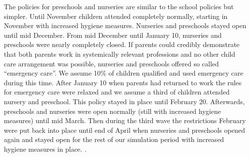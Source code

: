 The policies for preschools and nurseries are similar to the school policies but simpler.
Until November children attended completely normally, starting in November with increased
hygiene measures. Nurseries and preschools stayed open until mid December. From mid
December until January 10, nurseries and preschools were nearly completely closed. If
parents could credibly demonstrate that both parents work in systemically relevant
professions and no other child care arrangement was possible, nurseries and preschools
offered so called ``emergency care''. We assume 10\% of children qualified and used
emergency care during this time. After January 10 when parents had returned to work the
rules for emergency care were relaxed and we assume a third of children attended nursery
and preschool. This policy stayed in place until February 20. Afterwards, preschools and
nurseries were open normally (still with increased hygiene measures) until mid March.
Then during the third wave the restrictions February were put back into place until end
of April when nurseries and preschools opened again and stayed open for the rest of our
simulation period with increased hygiene measures in place. \citep{KiTa_BY, KiTa_NRW,
KiTa_BW, KiTa_BWa, KiTa_BYa, school_BWb}.
